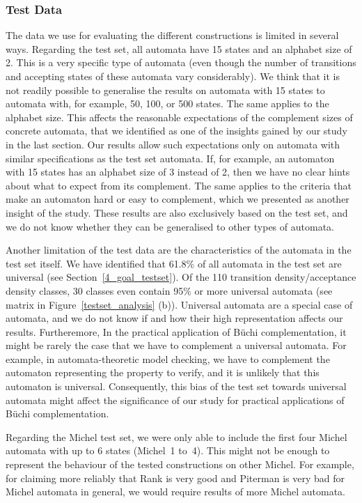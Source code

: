 \subsubsection{Test Data}
The data we use for evaluating the different constructions is limited in several ways. Regarding the \goal{} test set, all automata have 15 states and an alphabet size of 2. This is a very specific type of automata (even though the number of transitions and accepting states of these automata vary considerably). We think that it is not readily possible to generalise the results on automata with 15 states to automata with, for example, 50, 100, or 500 states. The same applies to the alphabet size. This affects the reasonable expectations of the complement sizes of concrete automata, that we identified as one of the insights gained by our study in the last section. Our results allow such expectations only on automata with similar specifications as the \goal{} test set automata. If, for example, an automaton with 15 states has an alphabet size of 3 instead of 2, then we have no clear hints about what to expect from its complement. The same applies to the criteria that make an automaton hard or easy to complement, which we presented as another insight of the study. These results are also exclusively based on the \goal{} test set, and we do not know whether they can be generalised to other types of automata.

Another limitation of the test data are the characteristics of the automata in the \goal{} test set itself. We have identified that 61.8\% of all automata in the \goal{} test set are universal (see Section~\ref{4_goal_testset}). Of the 110 transition density/acceptance density classes, 30 classes even contain 95\% or more universal automata (see matrix in Figure~\ref{testset_analysis} (b)). Universal automata are a special case of automata, and we do not know if and how their high representation affects our results. Furtheremore, In the practical application of Büchi complementation, it might be rarely the case that we have to complement a universal automata. For example, in automata-theoretic model checking, we have to complement the automaton representing the property to verify, and it is unlikely that this automaton is universal. Consequently, this bias of the \goal{} test set towards universal automata might affect the significance of our study for practical applications of Büchi complementation.

Regarding the Michel test set, we were only able to include the first four Michel automata with up to 6 states (Michel~1 to~4). This might not be enough to represent the behaviour of the tested constructions on other Michel. For example, for claiming more reliably that Rank is very good and Piterman is very bad for Michel automata in general, we would require results of more Michel automata.


